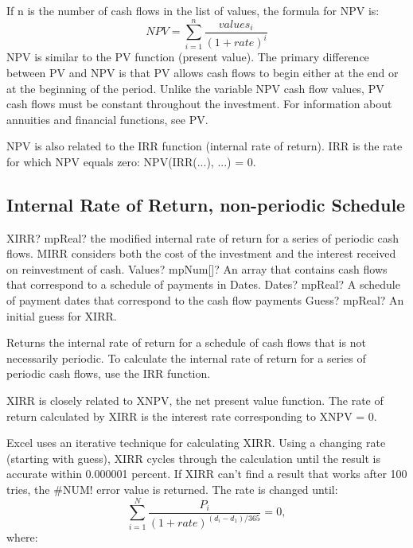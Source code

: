 If n is the number of cash flows in the list of values, the formula for NPV is: 
\begin{equation}
	NPV = \sum_{i=1}^n \frac{values_i}{(1+rate)^i}
\end{equation}
NPV is similar to the PV function (present value). The primary difference between PV and NPV is that PV allows cash flows to begin either at the end or at the beginning of the period. Unlike the variable NPV cash flow values, PV cash flows must be constant throughout the investment. For information about annuities and financial functions, see PV.

NPV is also related to the IRR function (internal rate of return). IRR is the rate for which NPV equals zero: NPV(IRR(...), ...) = 0.





\subsection{Internal Rate of Return, non-periodic Schedule}

\begin{mpFunctionsExtract}
	\mpWorksheetFunctionThreeNotImplemented
	{XIRR? mpReal? the modified internal rate of return for a series of periodic cash flows. MIRR considers both the cost of the investment and the interest received on reinvestment of cash.}
	{Values? mpNum[]? An array that contains cash flows that correspond to a schedule of payments in Dates.}
	{Dates? mpReal? A schedule of payment dates that correspond to the cash flow payments}
	{Guess? mpReal? An initial guess for XIRR.}
\end{mpFunctionsExtract}

\vspace{0.3cm}
Returns the internal rate of return for a schedule of cash flows that is not necessarily periodic. To calculate the internal rate of return for a series of periodic cash flows, use the IRR function.

XIRR is closely related to XNPV, the net present value function. The rate of return calculated by XIRR is the interest rate corresponding to XNPV = 0.

Excel uses an iterative technique for calculating XIRR. Using a changing rate (starting with guess), XIRR cycles through the calculation until the result is accurate within 0.000001 percent. If XIRR can't find a result that works after 100 tries, the \#NUM! error value is returned. The rate is changed until: 
\begin{equation}
	\sum_{i=1}^N \frac{P_i}{(1+rate)^{(d_i-d_1)/365}} = 0,
\end{equation}
where:

